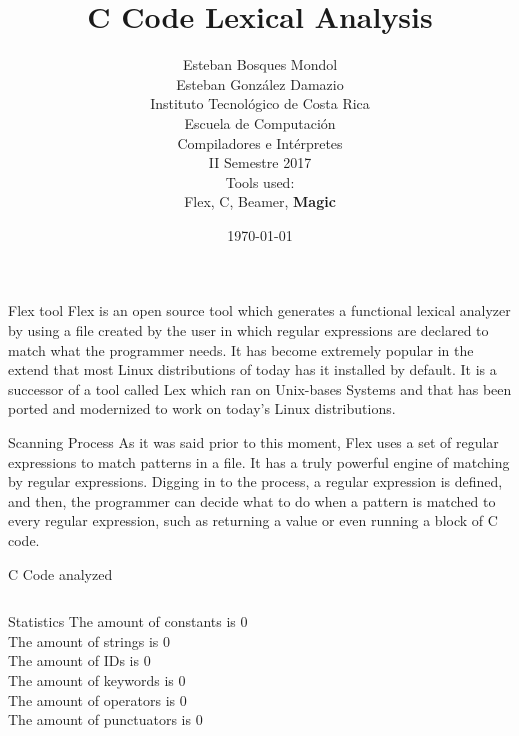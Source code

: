 \documentclass{beamer} %
\title[]{C Code Lexical Analysis}
\author[Bosques \& G. Damazio]{Esteban Bosques Mondol \\ Esteban Gonz\'alez Damazio \\[1\baselineskip]
	Instituto Tecnol\'ogico de Costa Rica \\
	Escuela de Computaci\'on\\
	Compiladores e Int\'erpretes \\
	II Semestre 2017\\[1\baselineskip]
	Tools used: \\
	Flex, C, Beamer,	{\bfseries \large Magic}
}
\date{\today}
\begin{document}
	
	\begin{frame}
	\titlepage
\end{frame}

\begin{frame}{Flex tool}
	Flex is an open source tool which generates a functional lexical analyzer by using a file created by the user in which regular expressions are declared to match what the programmer needs. It has become extremely popular in the extend that most Linux distributions of today has it installed by default. It is a successor of a tool called Lex which ran on Unix-bases Systems and that has been ported and modernized to work on today's Linux distributions.
\end{frame}

\begin{frame}{Scanning Process}
As it was said prior to this moment, Flex uses a set of regular expressions to match patterns in a file. It has a truly powerful engine of matching by regular expressions. Digging in to the process, a regular expression is defined, and then, the programmer can decide what to do when a pattern is matched to every regular expression, such as returning a value or even running a block of C code.
\end{frame}







\begin{frame}[fragile]{C Code analyzed}
\begin{flushleft}
	\begin{lstlisting}[breaklines]
		\end{lstlisting}
	\end{flushleft}
\end{frame}

\begin{frame}{Statistics}
The amount of constants is 0\\
The amount of strings is 0\\
The amount of IDs is 0\\
The amount of keywords is 0\\
The amount of operators is 0\\
The amount of punctuators is 0\\
\end{frame}
\end{document}
